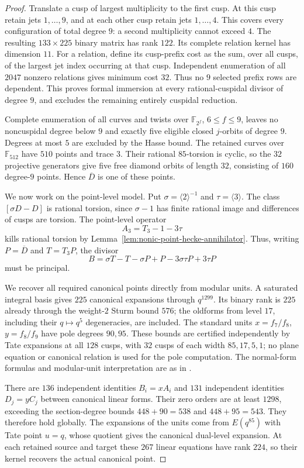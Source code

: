 \begin{proof}
Translate a cusp of largest multiplicity to the first cusp. At this cusp retain jets $1,\ldots,9$, and at each other cusp retain jets $1,\ldots,4$. This covers every configuration of total degree $9$: a second multiplicity cannot exceed $4$. The resulting $133\times225$ binary matrix has rank $122$. Its complete relation kernel has dimension $11$. For a relation, define its cusp-prefix cost as the sum, over all cusps, of the largest jet index occurring at that cusp. Independent enumeration of all $2047$ nonzero relations gives minimum cost $32$. Thus no $9$ selected prefix rows are dependent. This proves formal immersion at every rational-cuspidal divisor of degree $9$, and excludes the remaining entirely cuspidal reduction.

Complete enumeration of all curves and twists over $\mathbb F_{2^f}$, $6\leq f\leq9$, leaves no noncuspidal degree below $9$ and exactly five eligible closed $j$-orbits of degree $9$. Degrees at most $5$ are excluded by the Hasse bound. The retained curves over $\mathbb F_{512}$ have $510$ points and trace $3$. Their rational $85$-torsion is cyclic, so the $32$ projective generators give five free diamond orbits of length $32$, consisting of $160$ degree-$9$ points. Hence $\overline D$ is one of these points.

We now work on the point-level model. Put $\sigma=\langle2\rangle^{-1}$ and $\tau=\langle3\rangle$. The class $[\sigma D-D]$ is rational torsion, since $\sigma-1$ has finite rational image and differences of cusps are torsion. The point-level operator
\[
 A_3=T_3-1-3\tau
\]
kills rational torsion by Lemma~\ref{lem:nonic-point-hecke-annihilator}. Thus, writing $P=\overline D$ and $T=T_3P$, the divisor
\[
 B=\sigma T-T-\sigma P+P-3\sigma\tau P+3\tau P
\]
must be principal.

We recover all required canonical points directly from modular units. A saturated integral basis gives $225$ canonical expansions through $q^{1299}$. Its binary rank is $225$ already through the weight-$2$ Sturm bound $576$; the oldforms from level $17$, including their $q\mapsto q^5$ degeneracies, are included. The standard units $x=f_7/f_8$, $y=f_8/f_9$ have pole degrees $90,95$. These bounds are certified independently by Tate expansions at all $128$ cusps, with $32$ cusps of each width $85,17,5,1$; no plane equation or canonical relation is used for the pole computation. The normal-form formulas and modular-unit interpretation are as in \cite[Sections~2 and~2.1]{DvH}.

There are $136$ independent identities $B_i=xA_i$ and $131$ independent identities $D_j=yC_j$ between canonical linear forms. Their zero orders are at least $1298$, exceeding the section-degree bounds $448+90=538$ and $448+95=543$. They therefore hold globally. The expansions of the units come from $E(q^{85})$ with Tate point $u=q$, whose quotient gives the canonical dual-level expansion. At each retained source and target these $267$ linear equations have rank $224$, so their kernel recovers the actual canonical point.


\end{proof}
